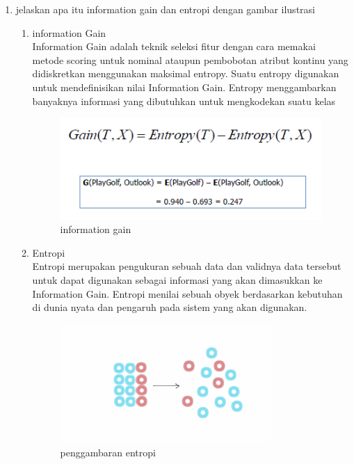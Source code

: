 \begin{enumerate}
\item jelaskan apa itu information gain dan entropi dengan gambar ilustrasi

\begin{enumerate}
	\item information Gain
	\hfill\\
	Information Gain adalah teknik seleksi fitur dengan cara memakai metode scoring untuk nominal ataupun pembobotan atribut kontinu yang didiskretkan menggunakan maksimal entropy. Suatu entropy digunakan untuk mendefinisikan nilai Information Gain. Entropy menggambarkan banyaknya informasi yang dibutuhkan untuk mengkodekan suatu kelas 
\begin{figure}[H]
    \includegraphics[width=12cm]{figures/1174084/2/9.png}
    \centering
    \caption{information gain}
\end{figure}

	\item Entropi
	\hfill\\
	Entropi merupakan pengukuran sebuah data dan validnya data tersebut untuk dapat digunakan sebagai informasi yang akan dimasukkan ke Information Gain. Entropi menilai sebuah obyek berdasarkan kebutuhan di dunia nyata dan pengaruh pada sistem yang akan digunakan.
\begin{figure}[H]
    \includegraphics[width=8cm]{figures/1174084/2/10.png}
    \centering
    \caption{penggambaran entropi}
\end{figure}
\end{enumerate}
\end{enumerate}



